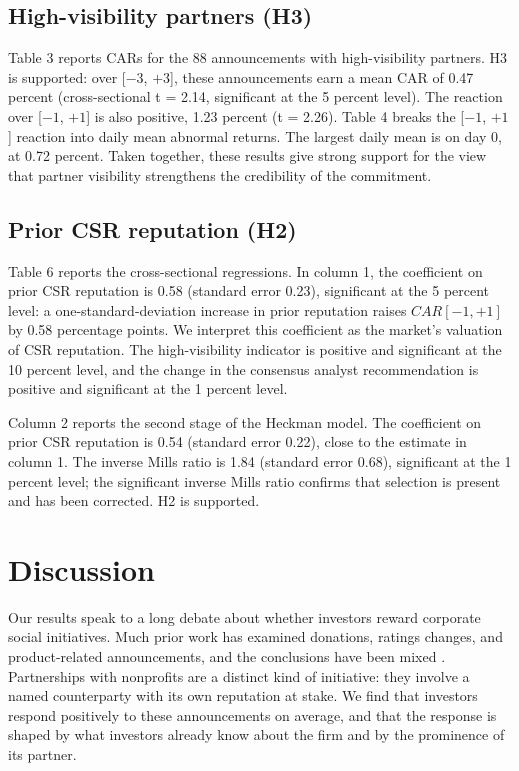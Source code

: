\documentclass[11pt]{article}
\newcommand{\win}[2]{[$#1$, $#2$]}
\begin{document}
\subsection{High-visibility partners (H3)}

Table 3 reports CARs for the 88 announcements with high-visibility partners. H3 is supported: over [$-3$, $+3$], these announcements earn a mean CAR of 0.47 percent (cross-sectional t = 2.14, significant at the 5 percent level). The reaction over \win{-1}{+1} is also positive, 1.23 percent (t = 2.26). Table 4 breaks the \win{-1}{+1} reaction into daily mean abnormal returns. The largest daily mean is on day 0, at 0.72 percent. Taken together, these results give strong support for the view that partner visibility strengthens the credibility of the commitment.

\subsection{Prior CSR reputation (H2)}

Table 6 reports the cross-sectional regressions. In column 1, the coefficient on prior CSR reputation is 0.58 (standard error 0.23), significant at the 5 percent level: a one-standard-deviation increase in prior reputation raises $CAR[-1, +1]$ by 0.58 percentage points. We interpret this coefficient as the market's valuation of CSR reputation. The high-visibility indicator is positive and significant at the 10 percent level, and the change in the consensus analyst recommendation is positive and significant at the 1 percent level.

Column 2 reports the second stage of the Heckman model. The coefficient on prior CSR reputation is 0.54 (standard error 0.22), close to the estimate in column 1. The inverse Mills ratio is 1.84 (standard error 0.68), significant at the 1 percent level; the significant inverse Mills ratio confirms that selection is present and has been corrected. H2 is supported.

\section{Discussion}

Our results speak to a long debate about whether investors reward corporate social initiatives. Much prior work has examined donations, ratings changes, and product-related announcements, and the conclusions have been mixed \citep{mcwilliamssiegelteoh1999}. Partnerships with nonprofits are a distinct kind of initiative: they involve a named counterparty with its own reputation at stake. We find that investors respond positively to these announcements on average, and that the response is shaped by what investors already know about the firm and by the prominence of its partner.
\end{document}
